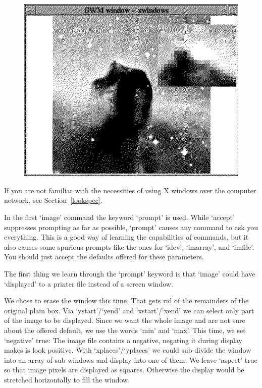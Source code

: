\documentclass[11pt,twoside]{article}
\newcommand{\htmlref}[2]{#1}
\newcommand{\latorhtm}[2]{#1}
\newcommand{\latorhtm}[2]{#2}
\begin{document}
\begin{figure}[htb]
\begin{center}
\includegraphics{sun86_imag2}
\end{center}
\end{figure}

   If you are not familiar with the necessities of using X windows over
   the computer network, see
   \latorhtm{Section~\ref{lookspec}.}
   {the section on \htmlref{plotting a spectrum.}{lookspec}}


   In the first `image' command the keyword `prompt' is used. While
   `accept' suppresses prompting as far as possible, `prompt' causes
   any command to ask you everything. This is a good way of learning the
   capabilities of commands, but it also causes some spurious prompts
   like the ones for `idev', `imarray', and `imfile'. You should just
   accept the defaults offered for these parameters.

   The first thing we learn through the `prompt' keyword is that `image'
   could have `displayed' to a printer file instead of a screen window.

   We chose to erase the window this time. That gets rid of the
   remainders of the original plain box. Via `ystart'/`yend' and
   `xstart'/`xend' we can select only part of the image to be displayed.
   Since we want the whole image and are not sure about the offered
   default, we use the words `min' and `max'. This time, we set
   `negative' true: The image file contains a negative, negating it
   during display makes is look positive. With `xplaces'/`yplaces' we
   could sub-divide the window into an array of sub-windows and display
   into one of them. We leave `aspect' true so that image pixels are
   displayed as squares. Otherwise the display would be stretched
   horizontally to fill the window.
\end{document}
